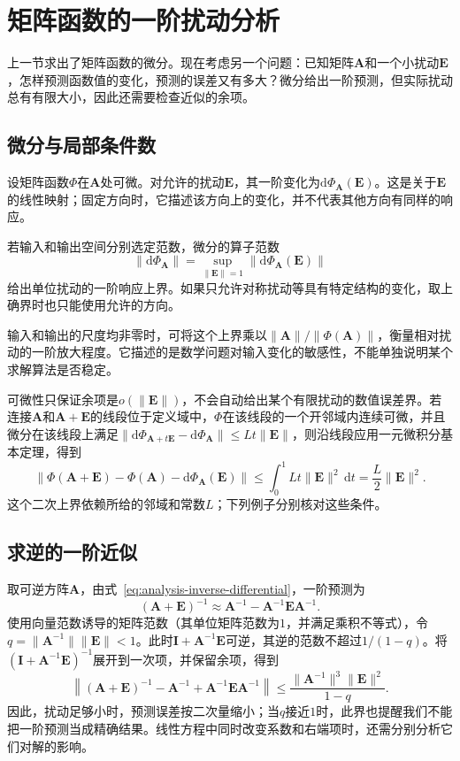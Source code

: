 \section{矩阵函数的一阶扰动分析}
\label{sec:multivariable-matrix-perturbation}

上一节求出了矩阵函数的微分。现在考虑另一个问题：已知矩阵$\bm A$和一个小扰动$\bm E$，怎样预测函数值的变化，预测的误差又有多大？微分给出一阶预测，但实际扰动总有有限大小，因此还需要检查近似的余项。

\subsection{微分与局部条件数}

设矩阵函数$\Phi$在$\bm A$处可微。对允许的扰动$\bm E$，其一阶变化为$\mathrm d\Phi_{\bm A}(\bm E)$。这是关于$\bm E$的线性映射；固定方向时，它描述该方向上的变化，并不代表其他方向有同样的响应。

若输入和输出空间分别选定范数，微分的算子范数
\[
 \lVert\mathrm d\Phi_{\bm A}\rVert
 =\sup_{\lVert\bm E\rVert=1}\lVert\mathrm d\Phi_{\bm A}(\bm E)\rVert
\]
给出单位扰动的一阶响应上界。如果只允许对称扰动等具有特定结构的变化，取上确界时也只能使用允许的方向。

输入和输出的尺度均非零时，可将这个上界乘以$\lVert\bm A\rVert/\lVert\Phi(\bm A)\rVert$，衡量相对扰动的一阶放大程度。它描述的是数学问题对输入变化的敏感性，不能单独说明某个求解算法是否稳定。

可微性只保证余项是$o(\lVert\bm E\rVert)$，不会自动给出某个有限扰动的数值误差界。若连接$\bm A$和$\bm A+\bm E$的线段位于定义域中，$\Phi$在该线段的一个开邻域内连续可微，并且微分在该线段上满足$\lVert\mathrm d\Phi_{\bm A+t\bm E}-\mathrm d\Phi_{\bm A}\rVert\leq Lt\lVert\bm E\rVert$，则沿线段应用一元微积分基本定理，得到
\[
 \left\lVert\Phi(\bm A+\bm E)-\Phi(\bm A)-\mathrm d\Phi_{\bm A}(\bm E)\right\rVert
 \leq\int_0^1 Lt\lVert\bm E\rVert^2\,\mathrm dt
 =\frac L2\lVert\bm E\rVert^2.
\]
这个二次上界依赖所给的邻域和常数$L$；下列例子分别核对这些条件。

\subsection{求逆的一阶近似}

取可逆方阵$\bm A$，由式~\eqref{eq:analysis-inverse-differential}，一阶预测为
\[
 (\bm A+\bm E)^{-1}\approx\bm A^{-1}-\bm A^{-1}\bm E\bm A^{-1}.
\]
使用向量范数诱导的矩阵范数（其单位矩阵范数为$1$，并满足乘积不等式），令$q=\lVert\bm A^{-1}\rVert\lVert\bm E\rVert<1$。此时$\bm I+\bm A^{-1}\bm E$可逆，其逆的范数不超过$1/(1-q)$。将$(\bm I+\bm A^{-1}\bm E)^{-1}$展开到一次项，并保留余项，得到
\[
 \left\lVert(\bm A+\bm E)^{-1}-\bm A^{-1}
 +\bm A^{-1}\bm E\bm A^{-1}\right\rVert
 \leq\frac{\lVert\bm A^{-1}\rVert^3\lVert\bm E\rVert^2}{1-q}.
\]
因此，扰动足够小时，预测误差按二次量缩小；当$q$接近$1$时，此界也提醒我们不能把一阶预测当成精确结果。线性方程中同时改变系数和右端项时，还需分别分析它们对解的影响。

